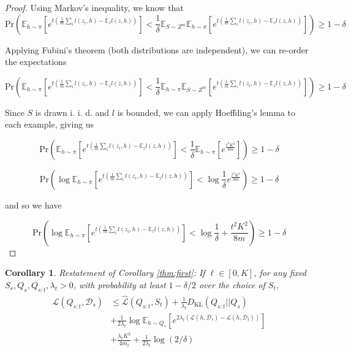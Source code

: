 \documentclass{article}
\theoremstyle{plain}
\newtheorem{corollary}[theorem]{Corollary}
\theoremstyle{definition}
\theoremstyle{remark}
\begin{document}
\begin{proof} 
	Using Markov's inequality, we know that 
	$$\textrm{Pr}\left (\mathbb{E}_{h\sim \pi}\left [e^{t(\frac{1}{m}\sum_i l(z_i,h)-\mathbb{E}_{z}l(z,h))}\right ]<\frac{1}{\delta}\mathbb{E}_{S\sim Z^m}\mathbb{E}_{h\sim \pi}\left [e^{t(\frac{1}{m}\sum_i l(z_i,h)-\mathbb{E}_{z}l(z,h))}\right ] \right ) \geq 1-\delta$$
	
	Applying Fubini's theorem (both distributions are independent), we can re-order the expectations
	
	$$\textrm{Pr}\left (\mathbb{E}_{h\sim \pi}\left [e^{t(\frac{1}{m}\sum_i l(z_i,h)-\mathbb{E}_{z}l(z,h))}\right ]<\frac{1}{\delta}\mathbb{E}_{h\sim \pi}\mathbb{E}_{S\sim Z^m}\left [e^{t(\frac{1}{m}\sum_i l(z_i,h)-\mathbb{E}_{z}l(z,h))}\right ] \right ) \geq 1-\delta$$
	
	Since $S$ is drawn i.\! i.\! d.\! and $l$ is bounded, we can apply Hoeffding's lemma to each example, giving us
	
	$$\textrm{Pr}\left (\mathbb{E}_{h\sim \pi}\left [e^{t(\frac{1}{m}\sum_i l(z_i,h)-\mathbb{E}_{z}l(z,h))}\right ]<\frac{1}{\delta}\mathbb{E}_{h\sim \pi}\left [e^{\frac{t^2K^2}{8m}}\right ] \right ) \geq 1-\delta$$
	
	$$\textrm{Pr}\left (\log\mathbb{E}_{h\sim \pi}\left [e^{t(\frac{1}{m}\sum_i l(z_i,h)-\mathbb{E}_{z}l(z,h))}\right ]<\log\frac{1}{\delta}e^{\frac{t^2K^2}{8m}} \right ) \geq 1-\delta$$
	
	and so we have 
	
	$$\textrm{Pr}\left (\log\mathbb{E}_{h\sim \pi}\left [e^{t(\frac{1}{m}\sum_i l(z_i,h)-\mathbb{E}_{z}l(z,h))}\right ]<\log\frac{1}{\delta}+\frac{t^2K^2}{8m} \right ) \geq 1-\delta$$
	
\end{proof}


\begin{corollary} Restatement of Corollary \ref{thm:first}:
If $\ell\in [0,K]$, for any fixed $S_s,Q_s,Q_{s:t},\lambda_t>0$, with probability at least $1-\delta/2$ over the choice of $S_t$,
\begin{align}
\begin{split}
\mathcal{L}(Q_{s:t}, \mathcal{D}_s) &\leq \hat{\mathcal{L}}(Q_{s:t}, S_t) + \frac{1}{\lambda_t} D_{\mathrm{KL}}(Q_{s:t}||Q_{s})\\
&+\frac{1}{2\lambda_t}\log \mathbb{E}_{h\sim Q_{s}}\left [e^{2\lambda_t(\mathcal{L}(h,\mathcal{D}_s)-\mathcal{L}(h,\mathcal{D}_t))}\right ]\\ &+\frac{\lambda_t K^2}{4m_t}+\frac{1}{2\lambda_t}\log(2/\delta)
\end{split}
\end{align}
\end{corollary}
\end{document}
